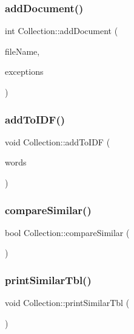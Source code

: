 \subsubsection{\texorpdfstring{add\+Document()}{addDocument()}}
{\footnotesize\ttfamily int Collection\+::add\+Document (\begin{DoxyParamCaption}\item[{istream \&}]{file\+Name,  }\item[{\hyperlink{class_replace}{Replace}}]{exceptions }\end{DoxyParamCaption})}

\mbox{\label{class_collection_abbd27617121505cf86345cdf9f74d58b}} 
\subsubsection{\texorpdfstring{add\+To\+I\+D\+F()}{addToIDF()}}
{\footnotesize\ttfamily void Collection\+::add\+To\+I\+DF (\begin{DoxyParamCaption}\item[{const \hyperlink{class_word_counts}{Word\+Counts} \&}]{words }\end{DoxyParamCaption})\hspace{0.3cm}{\ttfamily [protected]}}

\mbox{\label{class_collection_a31d244d8b65c7e869ee2855485e830b5}} 
\subsubsection{\texorpdfstring{compare\+Similar()}{compareSimilar()}}
{\footnotesize\ttfamily bool Collection\+::compare\+Similar (\begin{DoxyParamCaption}{ }\end{DoxyParamCaption})}

\mbox{\label{class_collection_a2078811e68c0508d0f313e4cc72ab90c}} 
\subsubsection{\texorpdfstring{print\+Similar\+Tbl()}{printSimilarTbl()}}
{\footnotesize\ttfamily void Collection\+::print\+Similar\+Tbl (\begin{DoxyParamCaption}{ }\end{DoxyParamCaption})}

